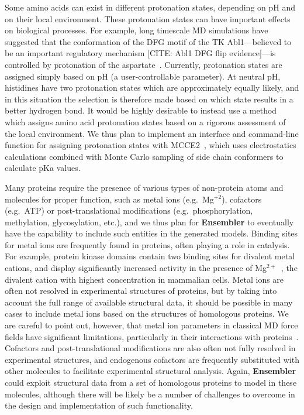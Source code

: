 \documentclass[aps,pre,twocolumn,nofootinbib,superscriptaddress,linenumbers]{revtex4-1}
\begin{document}
Some amino acids can exist in different protonation states, depending on pH and on their local environment.
These protonation states can have important effects on biological processes.
For example, long timescale MD simulations have suggested that the conformation of the DFG motif of the TK Abl1---believed to be an important regulatory mechanism [CITE: Abl1 DFG flip evidence]---is controlled by protonation of the aspartate~\cite{shan:pnas:2009:abl}.
Currently, protonation states are assigned simply based on pH (a user-controllable parameter).
At neutral pH, histidines have two protonation states which are approximately equally likely, and in this situation the selection is therefore made based on which state results in a better hydrogen bond.
It would be highly desirable to instead use a method which assigns amino acid protonation states based on a rigorous assessment of the local environment.
We thus plan to implement an interface and command-line function for assigning protonation states with MCCE2~\cite{alexov-gunner:biophys-j:1997:mcce2,georgescu-alexov-gunner:biophys-j:2002:mcce2,song-mao-gunner:j-comput-chem:2009:mcce2}, which uses electrostatics calculations combined with Monte Carlo sampling of side chain conformers to calculate pKa values.

Many proteins require the presence of various types of non-protein atoms and molecules for proper function, such as metal ions (e.g.~Mg$^{+2}$), cofactors (e.g.~ATP) or post-translational modifications (e.g.~phosphorylation, methylation, glycosylation, etc.), and we thus plan for {\bf Ensembler} to eventually have the capability to include such entities in the generated models.
Binding sites for metal ions are frequently found in proteins, often playing a role in catalysis.
For example, protein kinase domains contain two binding sites for divalent metal cations, and display significantly increased activity in the presence of Mg$^{2+}$~\cite{adams:prot-sci:1993:kinase-metal-ions}, the divalent cation with highest concentration in mammalian cells.
Metal ions are often not resolved in experimental structures of proteins, but by taking into account the full range of available structural data, it should be possible in many cases to include metal ions based on the structures of homologous proteins.
We are careful to point out, however, that metal ion parameters in classical MD force fields have significant limitations, particularly in their interactions with proteins~\cite{sousa:book:2010:metal-ion-parameters-difficulties}.
Cofactors and post-translational modifications are also often not fully resolved in experimental structures, and endogenous cofactors are frequently substituted with other molecules to facilitate experimental structural analysis.
Again, {\bf Ensembler} could exploit structural data from a set of homologous proteins to model in these molecules, although there will be likely be a number of challenges to overcome in the design and implementation of such functionality.
\end{document}
